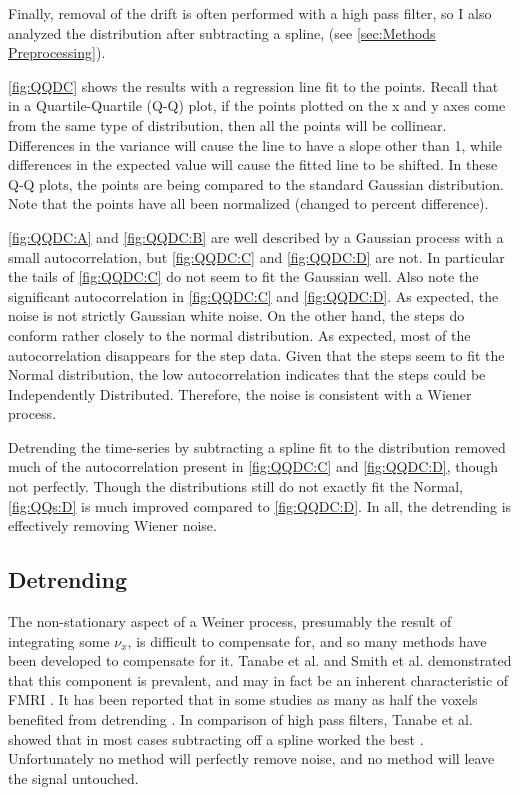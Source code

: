 Finally, removal of the drift is often performed with a high pass filter,
so I also analyzed the distribution after subtracting a spline, (see \autoref{sec:Methods Preprocessing}).

\autoref{fig:QQDC} shows the
results with a regression line fit to the points.
Recall that in a Quartile-Quartile (Q-Q) plot, if the points plotted on the
x and y axes come from the same type of distribution, then all the points will
be collinear. Differences in the variance will cause the line to have a slope
other than 1, while differences in the expected value will cause the fitted line
to be shifted. In these Q-Q plots, the points are being compared to the standard
Gaussian distribution. Note that the points have all been
normalized (changed to percent difference).

\autoref{fig:QQDC:A} and \autoref{fig:QQDC:B}
are well described by a Gaussian process with a small autocorrelation, but
\autoref{fig:QQDC:C} and \autoref{fig:QQDC:D} are not. In particular the tails of \autoref{fig:QQDC:C}
do not seem to fit the Gaussian well. Also note the significant autocorrelation in
\autoref{fig:QQDC:C} and \autoref{fig:QQDC:D}. As expected, the noise is not strictly
Gaussian white noise.  On the other hand, the steps do conform rather
closely to the normal distribution.
As expected, most of the autocorrelation disappears for the step data. Given
that the steps seem to fit the Normal distribution, the low autocorrelation
indicates that the steps could be Independently Distributed.
Therefore, the noise is consistent with a Wiener process.

Detrending the time-series by subtracting a spline fit to the distribution
removed much of the autocorrelation present in \autoref{fig:QQDC:C} and \autoref{fig:QQDC:D},
though not perfectly. Though the distributions still do not exactly fit
the Normal, \autoref{fig:QQs:D} is much improved compared to \autoref{fig:QQDC:D}.
In all, the detrending is effectively removing Wiener noise.

\subsection{Detrending}
\label{sec:Detrend}
The non-stationary
aspect of a Weiner process, presumably the result of integrating some
$\nu_x$, is difficult to compensate for, and so many methods
have been developed to compensate for it. Tanabe et al. and Smith et al.
demonstrated that this component is prevalent, and may in fact be an inherent  characteristic
of FMRI \cite{Tanabe2002, Smith1999}. It has been reported that in some studies as
many as half the voxels
benefited from detrending \cite{Smith2007}. In comparison of high pass 
filters, 
Tanabe et al.  showed that in most cases subtracting off
a spline worked the best \cite{Tanabe2002}.
Unfortunately no method will
perfectly remove noise, and no method will leave the signal untouched.

